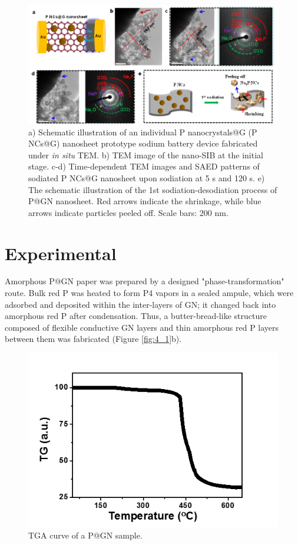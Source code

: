 \begin{figure} 
\centering
\includegraphics[width=\textwidth,angle=0]{figures/figure4_s3}
\caption[Design and characterizations of PNCs@G]
{a) Schematic illustration of an individual P nanocrystals@G (P NCs@G) nanosheet prototype sodium battery device fabricated under {\it in situ} TEM. b) TEM image of the nano-SIB at the initial stage. c-d) Time-dependent TEM images and SAED patterns of sodiated P NCs@G nanosheet upon sodiation at 5 s and 120 s. e) The schematic illustration of the 1st sodiation-desodiation process of P@GN nanosheet. Red arrows indicate the shrinkage, while blue arrows indicate particles peeled off. Scale bars: 200 nm. 
\label{fig:4_s3}}
\end{figure}

\section{Experimental}
Amorphous P@GN paper was prepared by a designed "phase-transformation" route. Bulk red P was heated to form P4 vapors in a sealed ampule, which were adsorbed and deposited within the inter-layers of GN; it changed back into amorphous red P after condensation.\cite{Roth1947b} Thus, a butter-bread-like structure composed of flexible conductive GN layers and thin amorphous red P layers between them was fabricated (Figure \ref{fig:4_1}b). 

\begin{figure}  
\centering
\includegraphics[width=320pt]{figures/figure4_s4}
\caption[TGA curve of P@GN]
{TGA curve of a P@GN sample.
\label{fig:4_s4}}
\end{figure}

